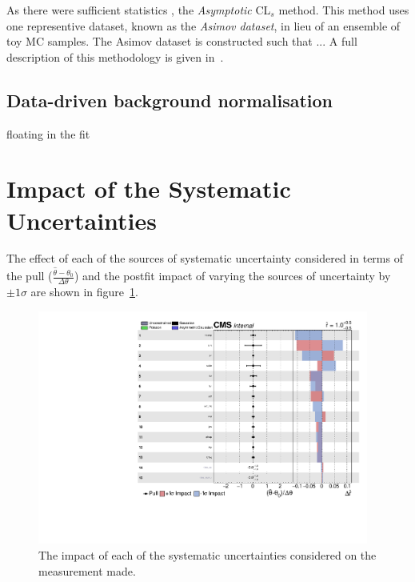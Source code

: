 As there were sufficient statistics , the \emph{Asymptotic} CL$_{s}$ method.
This method uses one representive dataset, known as the \emph{Asimov dataset}, in lieu of an ensemble of toy MC samples.
The Asimov dataset is constructed such that ...
A full description of this methodology is given in~\cite{Cowan:2010js}.

\subsection{Data-driven background normalisation}\label{subsec:combineNormalisation}
floating in the fit



\section{Impact of the Systematic Uncertainties}\label{sec:uncertainitiesImpact}
The effect of each of the sources of systematic uncertainty considered in terms of the pull ($\frac{ \hat{\theta} - \theta_{0} }{\Delta \theta}$) and the postfit impact of varying the sources of uncertainty by $\pm 1 \sigma$ are shown in figure~\ref{fig:systematicsPull}.


\begin{figure}[htbp]
\begin{center}
\includegraphics[width=0.97\textwidth]{figs/results/systematicsImpact.pdf}
\caption{The impact of each of the systematic uncertainties considered on the measurement made.}
\label{fig:systematicsPull}
\end{center}
\end{figure}

